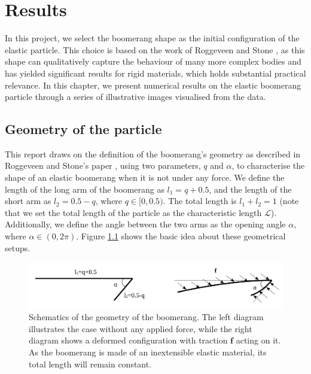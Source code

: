 \documentclass[12pt,MSc,twoside]{muthesis_2020}
\begin{document}
\chapter{Results}
In this project, we select the boomerang shape as the initial configuration of the elastic particle. This choice is based on the work of Roggeveen and Stone \cite{roggeveen2022motion}, as this shape can qualitatively capture the behaviour of many more complex bodies and has yielded significant results for rigid materials, which holds substantial practical relevance. In this chapter, we present numerical results on the elastic boomerang particle through a series of illustrative images visualised from the data.

\section{Geometry of the particle}
This report draws on the definition of the boomerang's geometry as described in Roggeveen and Stone's paper \cite{roggeveen2022motion}, using two parameters, $q$ and $\alpha$, to characterise the shape of an elastic boomerang when it is not under any force. We define the length of the long arm of the boomerang as $l_1=q+0.5$, and the length of the short arm as $l_2=0.5-q$, where $q \in [0,0.5)$. The total length is $l_1+l_2=1$ (note that we set the total length of the particle as the characteristic length $\mathcal{L}$). Additionally, we define the angle between the two arms as the opening angle $\alpha$, where $\alpha \in (0,2\pi)$. Figure \ref{fig:1} shows the basic idea about these geometrical setups. 
\begin{figure}[htb]
	\begin{center}
		\includegraphics[width=1\textwidth]{plot/geometry.png}
		\caption{Schematics of the geometry of the boomerang. The left diagram illustrates the case without any applied force, while the right diagram shows a deformed configuration with traction $\mathbf{f}$ acting on it. As the boomerang is made of an inextensible elastic material, its total length will remain constant.}
    \label{fig:1}
	\end{center}
\end{figure}
\end{document}
